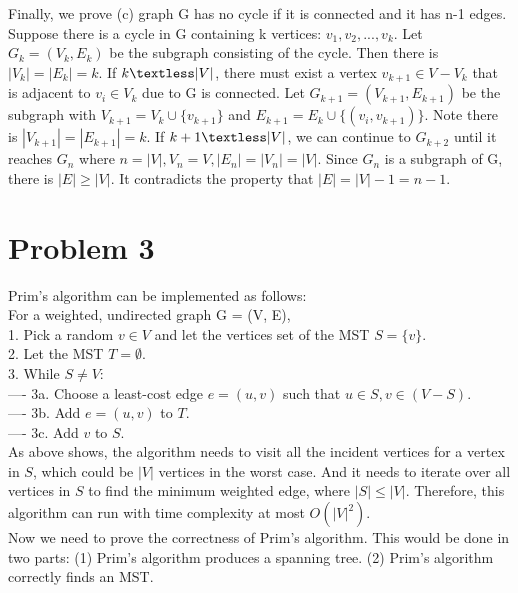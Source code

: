 \documentclass[titlepage, paper=a4, fontsize=11pt]{scrartcl} %
\numberwithin{equation}{section} %
\numberwithin{figure}{section} %
\numberwithin{table}{section} %
\begin{document}
Finally, we prove (c) graph G has no cycle if it is connected and it has n-1 edges. \\
Suppose there is a cycle in G containing k vertices: $v_1, v_2, ... , v_k$. Let $G_k = (V_k, E_k)$ be the subgraph consisting of the cycle. Then there is $|V_k| = |E_k| = k$. If $k \textless |V|$, there must exist a vertex $v_{k+1} \in V - V_k$ that is adjacent to $v_i \in V_k$ due to G is connected. Let $G_{k+1} = (V_{k+1}, E_{k+1})$ be the subgraph with $V_{k+1} = V_k \cup \{v_{k+1}\}$ and $E_{k+1} = E_k \cup \{(v_i, v_{k+1})\}$. Note there is $|V_{k+1}| = |E_{k+1}| = k$. If $k+1 \textless |V|$, we can continue to $G_{k+2}$ until it reaches $G_n$ where $n=|V|, V_n=V, |E_n|=|V_n|=|V|$. Since $G_n$ is a subgraph of G, there is $|E| \geq |V|$. It contradicts the property that $|E|=|V|-1=n-1$. \\





\section*{Problem 3}
Prim's algorithm can be implemented as follows: \\
For a weighted, undirected graph G = (V, E), \\
1. Pick a random $v \in V$ and let the vertices set of the MST $S=\{v\}$. \\
2. Let the MST $T=\emptyset$. \\
3. While $S \neq V$: \\
---- 3a. Choose a least-cost edge $e=(u,v)$ such that $u \in S, v \in (V-S)$. \\
---- 3b. Add $e=(u,v)$ to $T$. \\
---- 3c. Add $v$ to $S$. \\

As above shows, the algorithm needs to visit all the incident vertices for a vertex in $S$, which could be $|V|$ vertices in the worst case. And it needs to iterate over all vertices in $S$ to find the minimum weighted edge, where $|S| \leq |V|$. Therefore, this algorithm can run with time complexity at most $O(|V|^2)$. \\

Now we need to prove the correctness of Prim's algorithm. This would be done in two parts: (1) Prim's algorithm produces a spanning tree. (2) Prim's algorithm correctly finds an MST. \\
\end{document}

